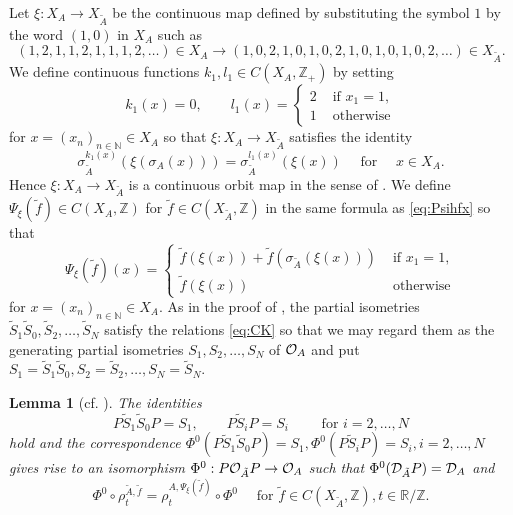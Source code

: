 \documentclass[11pt]{article}
\newtheorem{lemma}[theorem]{Lemma}
\theoremstyle{plain}
\theoremstyle{definition}
\numberwithin{equation}{section}
\newcommand{\N}{\mathbb{N}}
\newcommand{\RZ}{\mathbb{R}/{\mathbb{Z}}}
\newcommand{\Z}{\mathbb{Z}}
\newcommand{\Zp}{{\mathbb{Z}}_+}
\newcommand{\f}{\tilde{f}}
\begin{document}
Let
$\xi:X_A \rightarrow X_{\tilde{A}}$
be the continuous map
defined by
substituting  the symbol $1$ by the word $(1,0)$ 
in $X_A$ such as
\begin{equation}
(1,2,1,1,2,1,1,1,2, \dots) \in X_A
\rightarrow
(1,0,2,1,0,1,0,2,1,0,1,0,1,0,2, \dots) \in X_{\tilde{A}}.
\end{equation}
We define continuous functions
$k_1, l_1 \in C(X_A,\Zp)$
by setting
\begin{equation*}
k_1(x)=0,
\qquad
l_1(x)
=
\begin{cases}
2 & \text{ if } x_1 = 1, \\
1 & \text{ otherwise}
\end{cases}
\end{equation*}
for $x = (x_n)_{n \in \N} \in X_A$
so that 
$\xi:X_A \rightarrow X_{\tilde{A}}$
satisfies the identity
\begin{equation}
\sigma_{\tilde{A}}^{k_1(x)}(\xi(\sigma_A(x))) 
= \sigma_{\tilde{A}}^{l_1(x)}(\xi(x))
\quad \text{ for }
\quad 
x \in X_A. \label{eq: sigmaxi}
\end{equation}
Hence 
$\xi:X_A \rightarrow X_{\tilde{A}}$
is a continuous orbit map in the sense of 
\cite{MaPre2014}.
We define $\Psi_\xi(\f) \in C(X_A,\Z)$
for $\f \in C(X_{\tilde{A}},\Z) $
in the same formula as
\eqref{eq:Psihfx} so that
\begin{equation*}
\Psi_\xi(\f)(x) =
\begin{cases}
\f(\xi(x)) + \f(\sigma_{\tilde{A}}(\xi(x))) & \text{ if } x_1 =1, \\ 
\f(\xi(x)) & \text{ otherwise}
\end{cases}
\end{equation*}
for $x=(x_n)_{n \in \N} \in X_A$.
As in the proof of \cite[4.1 Theorem]{CK},
the partial isometries
$
\tilde{S}_1 \tilde{S}_0,
\tilde{S}_2, \dots,
\tilde{S}_N
$
satisfy the relations
\eqref{eq:CK}
so that we may regard them as the generating 
partial isometries
$S_1,S_2, \dots, S_N$
of ${{\mathcal{O}}_A}$ and put
$
S_1 =\tilde{S}_1 \tilde{S}_0,
S_2 =\tilde{S}_2, \dots,
S_N =\tilde{S}_N.
$
\begin{lemma}[{cf. \cite[4.1 Theorem]{CK}}] \label{lem:Phi0A}
The identities
\begin{equation}
P \tilde{S}_1 \tilde{S}_0 P = S_1,
\qquad
P \tilde{S}_i P = S_i
\qquad
\text{ for } i=2,\dots,N
\end{equation}
hold and the correspondence
$
\Phi^0(P \tilde{S}_1 \tilde{S}_0 P) = S_1,
\Phi^0(P \tilde{S}_i P) = S_i, i=2,\dots,N
$
gives rise to an isomorphism 
$\Phi^0:P{{\mathcal{O}}_{\tilde{A}}} P \rightarrow {{\mathcal{O}}_A}$
such that
$\Phi^0({{\mathcal{D}}_{\tilde{A}}} P)= {{\mathcal{D}}_A}$
and
\begin{equation*}
\Phi^0 \circ \rho^{{\tilde{A}},\f}_t 
=\rho^{A, \Psi_\xi(\f)}_t\circ \Phi^0
\quad
\text{ for }
\f \in C(X_{\tilde{A}},\Z),
t \in \RZ.
\end{equation*}  
\end{lemma}
\end{document}
